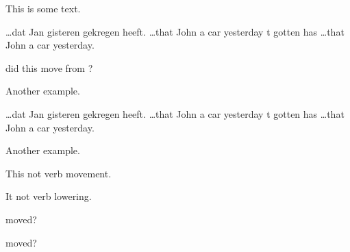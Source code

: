 \documentclass{article}
\begin{document}
This is some text.
\begin{subexamples}
	\item\arrowgloss\digloss
	    {\ldots dat Jan  gisteren   gekregen heeft.}
	    {\ldots that John {a \hspace*{1em} car}  yesterday t gotten has}
	    {\ldots that John a car yesterday.}
	\item {} did this move from ?
	\item Another example.
		\item\digloss
	    {\ldots dat Jan  gisteren   gekregen heeft.}
	    {\ldots that John {a \hspace*{1em} car}  yesterday t gotten has}
	    {\ldots that John a car yesterday.}
	\item Another example.
\end{subexamples}

\begin{subexamples}
\item This  not  verb movement.
\item It   not  verb lowering.
\arrowstrut
\end{subexamples}
\begin{subexamples}
\item
{}   
moved? 
\item{}   
moved?  
\end{subexamples}
\end{document}
